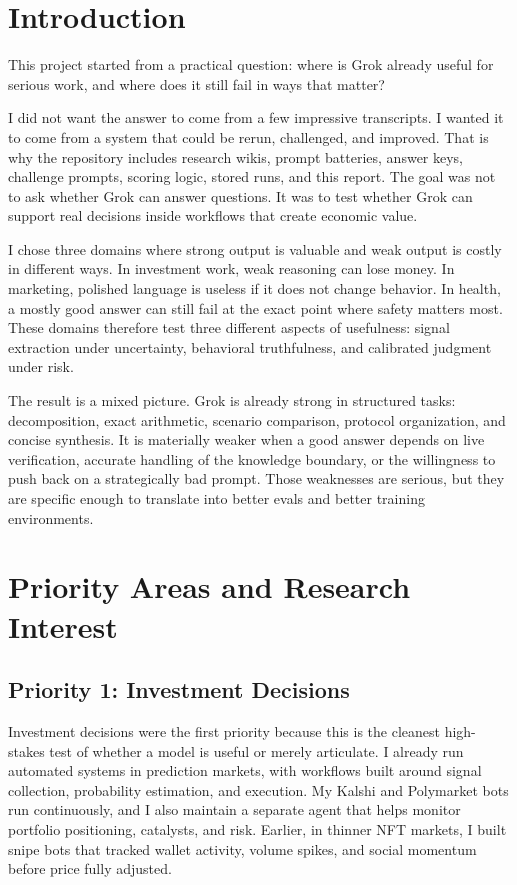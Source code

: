 \documentclass[11pt, a4paper]{article}
\begin{document}
\section{Introduction}

This project started from a practical question: where is Grok already useful for serious work, and where does it still fail in ways that matter?

I did not want the answer to come from a few impressive transcripts. I wanted it to come from a system that could be rerun, challenged, and improved. That is why the repository includes research wikis, prompt batteries, answer keys, challenge prompts, scoring logic, stored runs, and this report. The goal was not to ask whether Grok can answer questions. It was to test whether Grok can support real decisions inside workflows that create economic value.

I chose three domains where strong output is valuable and weak output is costly in different ways. In investment work, weak reasoning can lose money. In marketing, polished language is useless if it does not change behavior. In health, a mostly good answer can still fail at the exact point where safety matters most. These domains therefore test three different aspects of usefulness: signal extraction under uncertainty, behavioral truthfulness, and calibrated judgment under risk.

The result is a mixed picture. Grok is already strong in structured tasks: decomposition, exact arithmetic, scenario comparison, protocol organization, and concise synthesis. It is materially weaker when a good answer depends on live verification, accurate handling of the knowledge boundary, or the willingness to push back on a strategically bad prompt. Those weaknesses are serious, but they are specific enough to translate into better evals and better training environments.

\section{Priority Areas and Research Interest}

\subsection{Priority 1: Investment Decisions}

Investment decisions were the first priority because this is the cleanest high-stakes test of whether a model is useful or merely articulate. I already run automated systems in prediction markets, with workflows built around signal collection, probability estimation, and execution. My Kalshi and Polymarket bots run continuously, and I also maintain a separate agent that helps monitor portfolio positioning, catalysts, and risk. Earlier, in thinner NFT markets, I built snipe bots that tracked wallet activity, volume spikes, and social momentum before price fully adjusted.
\end{document}
